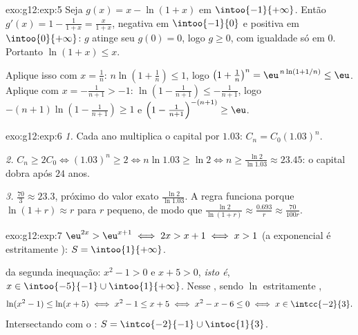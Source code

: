 \begin{solution}{exo:g12:exp:5}
Seja $g(x) = x - \ln(1+x)$ em $\intoo{-1}{+\infty}$. Então
$g'(x) = 1 - \frac{1}{1+x} = \frac{x}{1+x}$, negativa em
$\intoo{-1}{0}$ e positiva em $\intoo{0}{+\infty}$: $g$ atinge seu 
$g(0) = 0$, logo $g \geq 0$, com igualdade só em $0$. Portanto
$\ln(1+x) \leq x$.

Aplique isso com $x = \frac1n$:
$n\ln\left(1 + \frac1n\right) \leq 1$, logo
$\left(1+\frac1n\right)^n = \eu^{\,n\ln(1+1/n)} \leq \eu$. Aplique com
$x = -\frac{1}{n+1} > -1$:
$\ln\left(1 - \frac{1}{n+1}\right) \leq -\frac{1}{n+1}$, logo
$-(n+1)\ln\left(1 - \frac{1}{n+1}\right) \geq 1$ e
$\left(1 - \frac{1}{n+1}\right)^{-(n+1)} \geq \eu$.
\end{solution}

\begin{solution}{exo:g12:exp:6}
\emph{1.} Cada ano multiplica o capital por $1.03$:
$C_n = C_0 (1.03)^n$.

\emph{2.} $C_n \geq 2C_0 \iff (1.03)^n \geq 2 \iff n \ln 1.03 \geq \ln 2
\iff n \geq \frac{\ln 2}{\ln 1.03} \approx 23.45$: o capital dobra após
$24$ anos.

\emph{3.} $\frac{70}{3} \approx 23.3$, próximo do valor exato
$\frac{\ln 2}{\ln 1.03}$. A regra funciona porque
$\ln(1 + r) \approx r$ para $r$ pequeno, de modo que
$\frac{\ln 2}{\ln(1+r)} \approx \frac{0.693}{r} \approx \frac{70}{100r}$.
\end{solution}

\begin{solution}{exo:g12:exp:7}
$\eu^{2x} > \eu^{x+1} \iff 2x > x + 1 \iff x > 1$ (a exponencial é
estritamente ): $S = \intoo{1}{+\infty}$.

 da segunda inequação: $x^2 - 1 > 0$ e $x + 5 > 0$, \emph{isto é},
$x \in \intoo{-5}{-1} \cup \intoo{1}{+\infty}$. Nesse , sendo
$\ln$ estritamente ,
\[
\ln(x^2-1) \leq \ln(x+5) \iff x^2 - 1 \leq x + 5 \iff x^2 - x - 6 \leq 0
\iff x \in \intcc{-2}{3}.
\]
Intersectando com o :
$S = \intco{-2}{-1} \cup \intoc{1}{3}$.
\end{solution}

